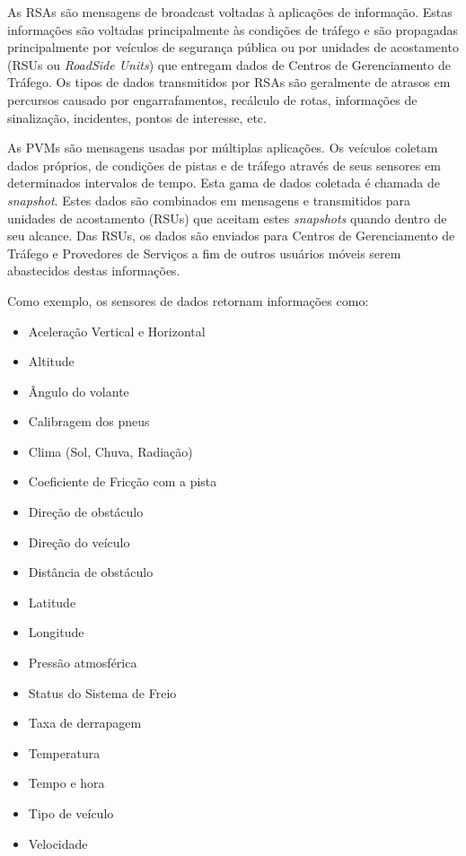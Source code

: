 \documentclass[
12pt,				%
openright,			%
oneside,			%
a4paper,			%
brazil,				%
]{abntex2}
\begin{document}
	\par As RSAs são mensagens de broadcast voltadas à aplicações de informação. Estas informações são voltadas principalmente às condições de tráfego e são propagadas principalmente por veículos de segurança pública ou por unidades de acostamento (RSUs ou \textit{RoadSide Units}) que entregam dados de Centros de Gerenciamento de Tráfego. Os tipos de dados transmitidos por RSAs são geralmente de atrasos em percursos causado por engarrafamentos, recálculo de rotas, informações de sinalização, incidentes, pontos de interesse, etc.
	
	\par As PVMs são mensagens usadas por múltiplas aplicações. Os veículos coletam dados próprios, de condições de pistas e de tráfego através de seus sensores em determinados intervalos de tempo. Esta gama de dados coletada é chamada de \textit{snapshot}. Estes dados são combinados em mensagens e transmitidos para unidades de acostamento (RSUs) que aceitam estes \textit{snapshots}  quando dentro de seu alcance. Das RSUs, os dados são enviados para Centros de Gerenciamento de Tráfego e Provedores de Serviços a fim de outros usuários móveis serem abastecidos destas informações.
	
	\par Como exemplo, os sensores de dados retornam informações como:
	
	\begin{itemize}
		\item Aceleração Vertical e Horizontal
		\item Altitude
		\item Ângulo do volante
		\item Calibragem dos pneus
		\item Clima (Sol, Chuva, Radiação)
		\item Coeficiente de Fricção com a pista
		\item Direção de obstáculo
		\item Direção do veículo
		\item Distância de obstáculo
		\item Latitude
		\item Longitude
		\item Pressão atmosférica
		\item Status do Sistema de Freio
		\item Taxa de derrapagem
		\item Temperatura
		\item Tempo e hora
		\item Tipo de veículo
		\item Velocidade
	\end{itemize}
	
\end{document}

